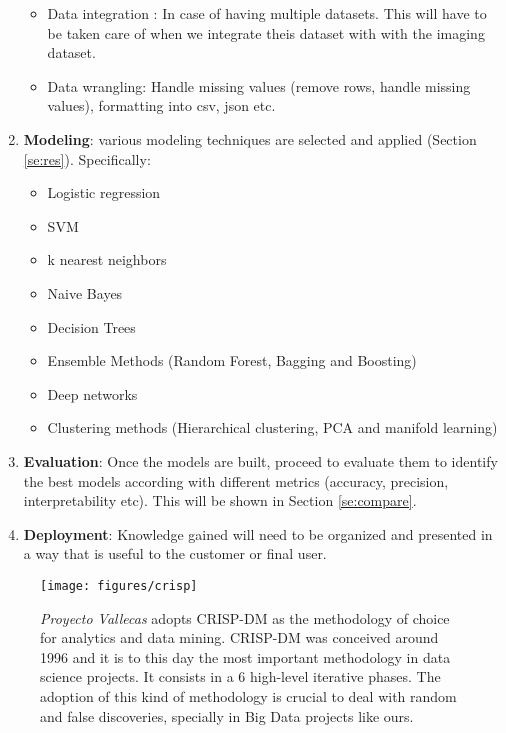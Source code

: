 \documentclass[11pt]{article}
\theoremstyle{definition}
\theoremstyle{remark}
\begin{document}
\begin{enumerate}
\begin{itemize}
		\item Data integration : In case of having multiple datasets. This will have to be taken care of when we integrate theis dataset with with the imaging dataset.
		\item Data wrangling: Handle missing values (remove rows, handle missing values), formatting into csv, json etc.
	\end{itemize}
\item \textbf{Modeling}: various modeling techniques are selected and applied (Section \ref{se:res}). Specifically:
	\begin{itemize}
		\item Logistic regression
		\item SVM
		\item k nearest neighbors
		\item Naive Bayes
		\item Decision Trees
		\item Ensemble Methods (Random Forest, Bagging and Boosting)
		\item Deep networks
		\item Clustering methods (Hierarchical clustering, PCA and manifold learning)
	\end{itemize}
\item \textbf{Evaluation}: Once the models are built, proceed to evaluate them to identify the best models according with different metrics (accuracy, precision, interpretability etc). This will be shown in Section \ref{se:compare}.
\item \textbf{Deployment}: Knowledge gained will need to be organized and presented in a way that is useful to the customer or final user.
\end{enumerate}

\begin{figure}[H]
        \centering
        \texttt{[image: figures/crisp]}
        \caption{\emph{Proyecto Vallecas} adopts CRISP-DM \cite{crispdmwiki} as the methodology of choice for analytics and data mining. CRISP-DM was conceived around 1996 and it is to this day the most important methodology in data science projects. It consists in a 6 high-level iterative phases. The adoption of this kind of methodology is crucial to deal with random and false discoveries, specially in Big Data projects like ours.}\label{fig:crisp}
\end{figure}
\end{document}
